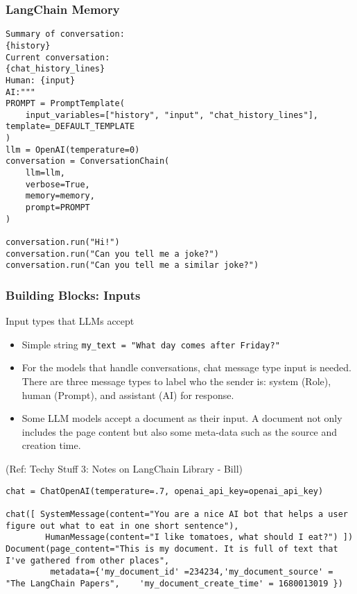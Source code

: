 \begin{frame}[fragile]\frametitle{LangChain Memory}


\begin{lstlisting}
Summary of conversation:
{history}
Current conversation:
{chat_history_lines}
Human: {input}
AI:"""
PROMPT = PromptTemplate(
    input_variables=["history", "input", "chat_history_lines"], template=_DEFAULT_TEMPLATE
)
llm = OpenAI(temperature=0)
conversation = ConversationChain(
    llm=llm, 
    verbose=True, 
    memory=memory,
    prompt=PROMPT
)

conversation.run("Hi!")
conversation.run("Can you tell me a joke?")
conversation.run("Can you tell me a similar joke?")
\end{lstlisting}	  

\end{frame}


\begin{frame}[fragile]\frametitle{Building Blocks: Inputs}

Input types that LLMs accept

\begin{itemize}
\item Simple string \lstinline|my_text = "What day comes after Friday?"|
\item For the models that handle conversations, chat message type input is needed. There are three message types to label who the sender is: system (Role), human (Prompt), and assistant (AI) for response.
\item Some LLM models accept a document as their input. A document not only includes the page content but also some meta-data such as the source and creation time.
\end{itemize}

{\tiny (Ref: Techy Stuff 3: Notes on LangChain Library - Bill)}

\begin{lstlisting}
chat = ChatOpenAI(temperature=.7, openai_api_key=openai_api_key)

chat([ SystemMessage(content="You are a nice AI bot that helps a user figure out what to eat in one short sentence"),
        HumanMessage(content="I like tomatoes, what should I eat?") ])
Document(page_content="This is my document. It is full of text that I've gathered from other places",
         metadata={'my_document_id' =234234,'my_document_source' = "The LangChain Papers",    'my_document_create_time' = 1680013019 })
\end{lstlisting}	  


\end{frame}

